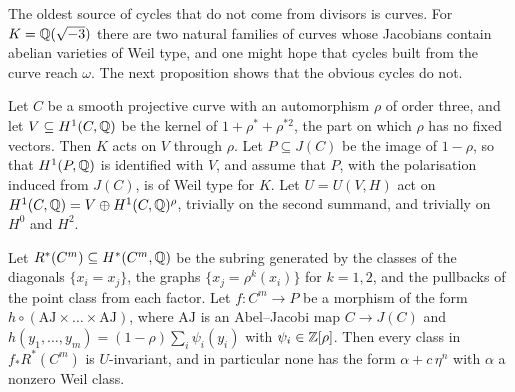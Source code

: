 The oldest source of cycles that do not come from divisors is curves. For
$K=\mathbb{Q}(\sqrt{-3})$ there are two natural families of curves whose
Jacobians contain abelian varieties of Weil type, and one might hope that
cycles built from the curve reach $\omega$. The next proposition shows that
the obvious cycles do not.

Let $C$ be a smooth projective curve with an automorphism $\rho$ of order
three, and let $V\subseteq H^{1}(C,\mathbb{Q})$ be the kernel of
$1+\rho^{*}+\rho^{*2}$, the part on which $\rho$ has no fixed vectors. Then
$K$ acts on $V$ through $\rho$. Let $P\subseteq J(C)$ be the image of
$1-\rho$, so that $H^{1}(P,\mathbb{Q})$ is identified with $V$, and assume that
$P$, with the polarisation induced from $J(C)$, is of Weil type for $K$.
Let $U=U(V,H)$ act on $H^{1}(C,\mathbb{Q})=V\oplus H^{1}(C,\mathbb{Q})^{\rho}$, trivially
on the second summand, and trivially on $H^{0}$ and $H^{2}$.

\begin{proposition}\label{prop:curvesbook}
Let $R^{*}(C^{m})\subseteq H^{*}(C^{m},\mathbb{Q})$ be the subring generated by
the classes of the diagonals $\{x_{i}=x_{j}\}$, the graphs
$\{x_{j}=\rho^{k}(x_{i})\}$ for $k=1,2$, and the pullbacks of the point
class from each factor. Let $f\colon C^{m}\to P$ be a morphism of the form
$h\circ(\mathrm{AJ}\times\dots\times\mathrm{AJ})$, where $\mathrm{AJ}$ is an
Abel--Jacobi map $C\to J(C)$ and
$h(y_{1},\dots,y_{m})=(1-\rho)\sum_{i}\psi_{i}(y_{i})$ with
$\psi_{i}\in\mathbb{Z}[\rho]$. Then every class in $f_{*}R^{*}(C^{m})$ is
$U$-invariant, and in particular none has the form $\alpha+c\,\eta^{n}$
with $\alpha$ a nonzero Weil class.
\end{proposition}

